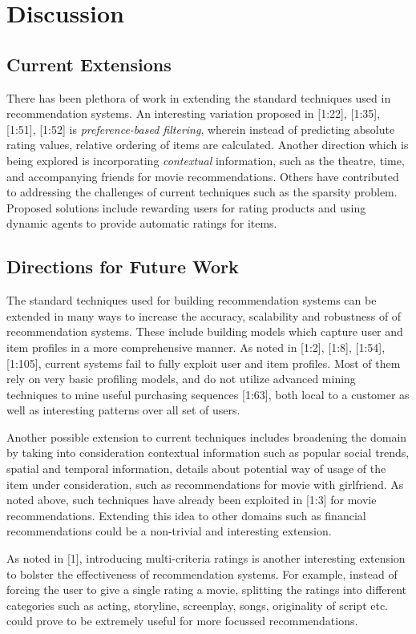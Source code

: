 \section{Discussion}
\subsection{Current Extensions}
There has been plethora of work in extending the standard techniques used in recommendation systems. An interesting variation proposed in [1:22], [1:35], [1:51], [1:52] is \textit{preference-based filtering}, wherein instead of predicting absolute rating values, relative ordering of items are calculated. Another direction which is being explored is incorporating \textit{contextual} information, such as the theatre, time, and accompanying friends for movie recommendations. Others have contributed to addressing the challenges of current techniques such as the sparsity problem. Proposed solutions include rewarding users for rating products and using dynamic agents to provide automatic ratings for items.
\subsection{Directions for Future Work}
The standard techniques used for building recommendation systems can be extended in many ways to increase the accuracy, scalability and robustness of of recommendation systems. These include building models which capture user and item profiles in a more comprehensive manner. As noted in [1:2], [1:8], [1:54], [1:105], current systems fail to fully exploit user and item profiles. Most of them rely on very basic profiling models, and do not utilize advanced mining techniques to mine useful purchasing sequences [1:63], both local to a customer as well as interesting patterns over all set of users.

Another possible extension to current techniques includes broadening the domain by taking into consideration contextual information such as popular social trends, spatial and temporal information, details about potential way of usage of the item under consideration, such as recommendations for movie with girlfriend. As noted above, such techniques have already been exploited in [1:3] for movie recommendations. Extending this idea to other domains such as financial recommendations could be a non-trivial and interesting extension.

As noted in [1], introducing multi-criteria ratings is another interesting extension to bolster the effectiveness of recommendation systems. For example, instead of forcing the user to give a single rating a movie, splitting the ratings into different categories such as acting, storyline, screenplay, songs, originality of script etc. could prove to be extremely useful for more focussed recommendations.

